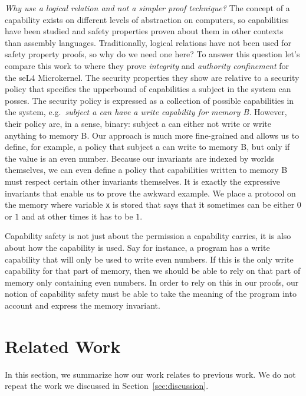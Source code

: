 \documentclass[format=acmsmall, review=true, screen=true]{acmart}
\renewcommand{\sectionname}{Section}
\newenvironment{toplas}{}{}
\newcommand{\itoplassug}[1]{}
\begin{document}
\begin{toplas}
  \emph{Why use a logical relation and not a simpler proof technique?}
  The concept of a capability exists on different levels of abstraction on computers, so capabilities have been studied and safety properties proven about them in other contexts than assembly languages.
  Traditionally, logical relations have not been used for safety property proofs, so why do we need one here?
  To answer this question let's compare this work to \citet{sewel_integrity_2011} where they prove \textit{integrity} and \textit{authority confinement} for the seL4 Microkernel.
  The security properties they show are relative to a security policy that specifies the upperbound of capabilities a subject in the system can posses.
  The security policy is expressed as a collection of possible capabilities in the system, e.g.\ \textit{subject a can have a write capability for memory B.}
  However, their policy are, in a sense, binary: subject a can either not write or write anything to memory B.
  Our approach is much more fine-grained and allows us to define, for example, a policy that subject a can write to memory B, but only if the value is an even number.
  Because our invariants are indexed by worlds themselves, we can even define a policy that capabilities written to memory B must respect certain other invariants themselves.
  It is exactly the expressive invariants that enable us to prove the awkward example.
  We place a protocol on the memory where variable \texttt{x} is stored that says that it sometimes can be either $0$ or $1$ and at other times it has to be $1$.
  
  Capability safety is not just about the permission a capability carries, it is also about how the capability is used.
  Say for instance, a program has a write capability that will only be used to write even numbers.
  If this is the only write capability for that part of memory, then we should be able to rely on that part of memory only containing even numbers.
  In order to rely on this in our proofs, our notion of capability safety must be able to take the meaning of the program into account and express the memory invariant.
\end{toplas}
\itoplassug{Reviewer C, popl, would like to know how local capabilities relate to borrowing (see tex comment).}

\section{Related Work}
\label{sec:related-work}
In this section, we summarize how our work relates to previous work.
We do not repeat the work we discussed in \sectionname~\ref{sec:discussion}.
\end{document}
